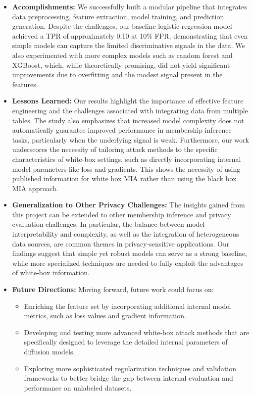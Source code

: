 \documentclass[12pt]{article}
\begin{document}
\begin{itemize}
    \item \textbf{Accomplishments:}  
    We successfully built a modular pipeline that integrates data preprocessing, feature extraction, model training, and prediction generation. Despite the challenges, our baseline logistic regression model achieved a TPR of approximately 0.10 at 10\% FPR, demonstrating that even simple models can capture the limited discriminative signals in the data. We also experimented with more complex models such as random forest and XGBoost, which, while theoretically promising, did not yield significant improvements due to overfitting and the modest signal present in the features.

    \item \textbf{Lessons Learned:}  
    Our results highlight the importance of effective feature engineering and the challenges associated with integrating data from multiple tables. The study also emphasizes that increased model complexity does not automatically guarantee improved performance in membership inference tasks, particularly when the underlying signal is weak. Furthermore, our work underscores the necessity of tailoring attack methods to the specific characteristics of white-box settings, such as directly incorporating internal model parameters like loss and gradients. This shows the necessity of using published information for white box MIA rather than using the black box MIA approach.

    \item \textbf{Generalization to Other Privacy Challenges:}  
    The insights gained from this project can be extended to other membership inference and privacy evaluation challenges. In particular, the balance between model interpretability and complexity, as well as the integration of heterogeneous data sources, are common themes in privacy-sensitive applications. Our findings suggest that simple yet robust models can serve as a strong baseline, while more specialized techniques are needed to fully exploit the advantages of white-box information.

    \item \textbf{Future Directions:}  
    Moving forward, future work could focus on:
    \begin{itemize}
        \item Enriching the feature set by incorporating additional internal model metrics, such as loss values and gradient information.
        \item Developing and testing more advanced white-box attack methods that are specifically designed to leverage the detailed internal parameters of diffusion models.
        \item Exploring more sophisticated regularization techniques and validation frameworks to better bridge the gap between internal evaluation and performance on unlabeled datasets.
    \end{itemize}
\end{itemize}
\end{document}
